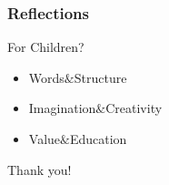 \documentclass{beamer}
\begin{document}
\begin{frame}
    \frametitle{Reflections}
    \begin{block}{For Children?}
        \begin{itemize}
            \item Words$\&$Structure
            \item Imagination$\&$Creativity
            \item Value$\&$Education
        \end{itemize}
    \end{block}
\end{frame}

\begin{frame}
    \Huge{\centerline{Thank you!}} 
\end{frame}
\end{document}
